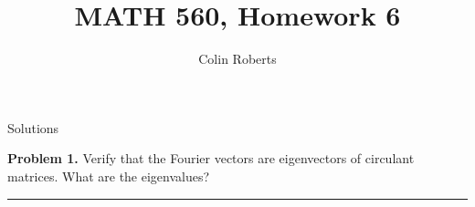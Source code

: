 \documentclass[leqno]{article}
\author{Colin Roberts}
\title{MATH 560, Homework 6}
\theoremstyle{nonumberplain}
\begin{document}
\maketitle
\begin{large}
\begin{center}
Solutions
\end{center}
\end{large}
\pagebreak

\noindent\textbf{Problem 1.} Verify that the Fourier vectors are eigenvectors of circulant matrices.  What are the eigenvalues? 

\noindent\rule[0.5ex]{\linewidth}{1pt}
\end{document}
